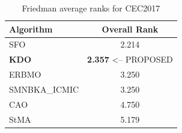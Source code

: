 \begin{table}[H]
\centering\small
\caption{Friedman average ranks for CEC2017}
\label{tab:cec2017_friedman}
\begin{tabular}{lc}
\toprule
\textbf{Algorithm} & \textbf{Overall Rank} \\
\midrule
SFO & 2.214 \\
\textbf{KDO} & \textbf{2.357}  <-- PROPOSED \\
ERBMO & 3.250 \\
SMNBKA_ICMIC & 3.250 \\
CAO & 4.750 \\
StMA & 5.179 \\
\bottomrule
\end{tabular}
\end{table}

